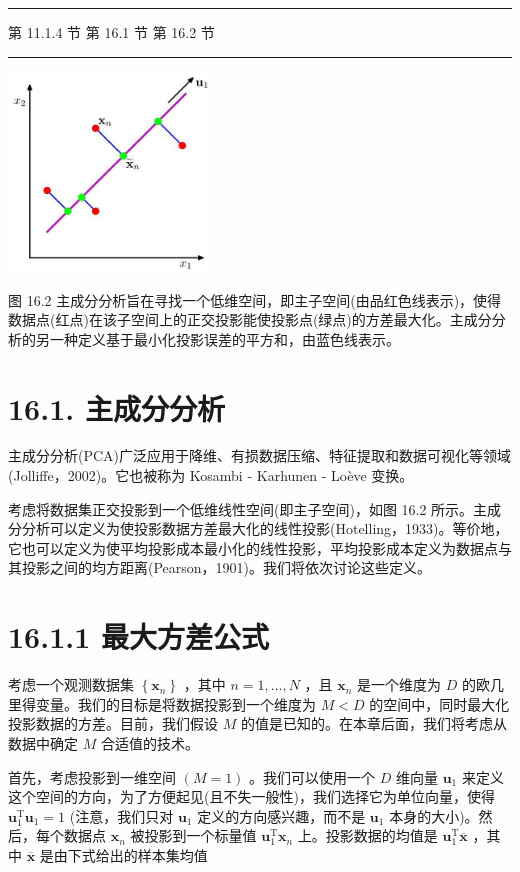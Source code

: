 \documentclass[10pt]{article}
\newcommand{\HRule}{\begin{center}\rule{0.9\linewidth}{0.2mm}\end{center}}
\begin{document}
\HRule

第 11.1.4 节 第 16.1 节 第 16.2 节

\HRule

\begin{center}
\includegraphics[max width=0.4\textwidth]{images/0194e279-9b28-703a-88f4-c3ac21e2010d_516_1048_344_500_497_0.jpg}
\end{center}
\hspace*{3em} 

图 16.2 主成分分析旨在寻找一个低维空间，即主子空间(由品红色线表示)，使得数据点(红点)在该子空间上的正交投影能使投影点(绿点)的方差最大化。主成分分析的另一种定义基于最小化投影误差的平方和，由蓝色线表示。

\section*{16.1. 主成分分析}

主成分分析(PCA)广泛应用于降维、有损数据压缩、特征提取和数据可视化等领域(Jolliffe，2002)。它也被称为 Kosambi - Karhunen - Loève 变换。

考虑将数据集正交投影到一个低维线性空间(即主子空间)，如图 16.2 所示。主成分分析可以定义为使投影数据方差最大化的线性投影(Hotelling，1933)。等价地，它也可以定义为使平均投影成本最小化的线性投影，平均投影成本定义为数据点与其投影之间的均方距离(Pearson，1901)。我们将依次讨论这些定义。

\section*{16.1.1 最大方差公式}

考虑一个观测数据集 \(\left\{  {\mathbf{x}}_{n}\right\}\) ，其中 \(n = 1,\ldots ,N\) ，且 \({\mathbf{x}}_{n}\) 是一个维度为 \(D\) 的欧几里得变量。我们的目标是将数据投影到一个维度为 \(M < D\) 的空间中，同时最大化投影数据的方差。目前，我们假设 \(M\) 的值是已知的。在本章后面，我们将考虑从数据中确定 \(M\) 合适值的技术。

首先，考虑投影到一维空间 \(\left( {M = 1}\right)\) 。我们可以使用一个 \(D\) 维向量 \({\mathbf{u}}_{1}\) 来定义这个空间的方向，为了方便起见(且不失一般性)，我们选择它为单位向量，使得 \({\mathbf{u}}_{1}^{\mathrm{T}}{\mathbf{u}}_{1} = 1\) (注意，我们只对 \({\mathbf{u}}_{1}\) 定义的方向感兴趣，而不是 \({\mathbf{u}}_{1}\) 本身的大小)。然后，每个数据点 \({\mathbf{x}}_{n}\) 被投影到一个标量值 \({\mathbf{u}}_{1}^{\mathrm{T}}{\mathbf{x}}_{n}\) 上。投影数据的均值是 \({\mathbf{u}}_{1}^{\mathrm{T}}\overline{\mathbf{x}}\) ，其中 \(\overline{\mathbf{x}}\) 是由下式给出的样本集均值
\end{document}
